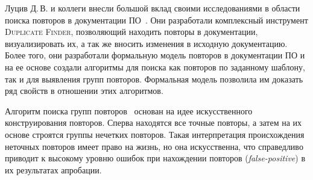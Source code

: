 

Луцив Д.\,В. и коллеги внесли большой вклад своими исследованиями в области поиска повторов в документации ПО~\cite{luciv2018detecting,luciv2018duplicate,luciv2019interactive,koznov2015clone,koznov2017duplicate,luciv2016fuzzy}. 
Они разработали комплексный инструмент \textsc{Duplicate Finder}, позволяющий находить повторы в документации, визуализировать их, а так же вносить изменения в исходную документацию.
Более того, они разработали формальную модель повторов в документации ПО и на ее основе создали алгоритмы для поиска как повторов по заданному шаблону, так и для выявления групп повторов.
Формальная модель позволила им доказать ряд свойств в отношении этих алгоритмов.

Алгоритм поиска групп повторов~\cite{luciv2016fuzzy} основан на  идее искусственного конструирования повторов.
Сперва находятся все точные повторы, а затем на их основе строятся группы нечетких повторов.
Такая интерпретация происхождения неточных повторов имеет право на жизнь, но она искусственна, что справедливо приводит к высокому уровню  ошибок при нахождении повторов (\emph{false-positive}) в их результатах апробации.


